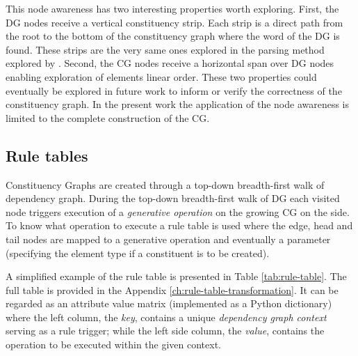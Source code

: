 This node awareness has two interesting properties worth exploring. First, the DG nodes receive a vertical constituency strip. Each strip is a direct path from the root to the bottom of the constituency graph where the word of the DG is found. These strips are the very same ones explored in the parsing method explored by \citet{Day2007}.    
Second, the CG nodes receive a horizontal span over DG nodes enabling exploration of elements linear order. These two properties could eventually be explored in future work to inform or verify the correctness of the constituency graph. In the present work the application of the node awareness is limited to the complete construction of the CG.

\subsection{Rule tables}
\label{sec:rule-table}

Constituency Graphs are created through a top-down breadth-first walk of dependency graph. During the top-down breadth-first walk of DG each visited node triggers execution of a \textit{generative operation} on the growing CG on the side. To know what operation to execute a rule table is used where the edge, head and tail nodes are mapped to a generative operation and eventually a parameter (specifying the element type if a constituent is to be created).

A simplified example of the rule table is presented in Table \ref{tab:rule-table}. The full table is provided in the Appendix \ref{ch:rule-table-transformation}. It can be regarded as an attribute value matrix (implemented as a Python dictionary) where the left column, the \textit{key}, contains a unique \textit{dependency graph context} serving as a rule trigger; while the left side column, the \textit{value}, contains the operation to be executed within the given context. 

